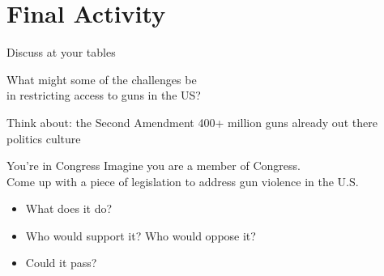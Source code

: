 \documentclass[aspectratio=169,11pt]{beamer}
\begin{document}
\section{Final Activity}

\begin{frame}{Discuss at your tables}
  \vfill
  \begin{center}
    {\Large What might some of the \alert{challenges} be\\in restricting access to guns in the US?}
  \end{center}
  \vfill
  \pause
  \begin{center}
    {\small\color{muted} Think about: the Second Amendment \textbullet{} 400+ million guns already out there \textbullet{} politics \textbullet{} culture}
  \end{center}
  \vspace{1em}
\end{frame}

\begin{frame}{You're in Congress}
  \relax Imagine you are a member of Congress.\\[0.6em]
  Come up with a \alert{piece of legislation} to address gun violence in the U.S.
  \vspace{1em}
  \begin{itemize}\setlength{\itemsep}{0.8em}
    \item What does it do?
    \item Who would support it? Who would oppose it?
    \item Could it pass?
  \end{itemize}
\end{frame}
\end{document}
